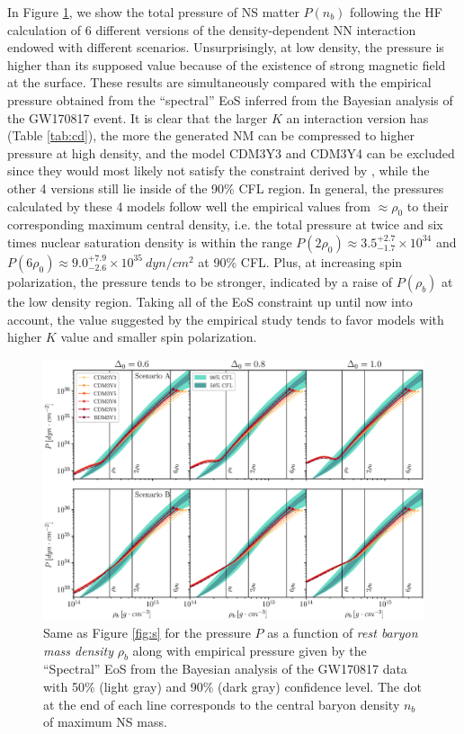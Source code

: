 In Figure \ref{fig:p}, we show the total pressure of \gls{NS} matter $P(n_b)$ following the \gls{HF} calculation of 6 different versions of the density-dependent \gls{NN} interaction endowed with different scenarios. Unsurprisingly, at low density, the pressure is higher than its supposed value because of the existence of strong magnetic field at the surface. These results are simultaneously compared with the empirical pressure obtained from the ``spectral'' \gls{EoS} inferred from the Bayesian analysis of the GW170817 event. It is clear that the larger $K$ an interaction version has (Table \ref{tab:cd}), the more the generated \gls{NM} can be compressed to higher pressure at high density, and the model CDM3Y3 and CDM3Y4 can be excluded since they would most likely not satisfy the constraint derived by \cite{abbott2018gw170817}, while the other 4 versions still lie inside of the 90\% \gls{CFL} region. In general, the pressures calculated by these 4 models follow well the empirical values from $\approx \rho_0$ to their corresponding maximum central density, i.e. the total pressure at twice and six times nuclear saturation density is within the range $P(2\rho_0)\approx 3.5^{+2.7}_{-1.7}\times 10^{34}$ and $P(6\rho_0)\approx 9.0^{+7.9}_{-2.6}\times 10^{35}\:dyn/cm^2$ at 90\% \gls{CFL}.  Plus, at increasing spin polarization, the pressure tends to be stronger, indicated by a raise of $P(\rho_b)$ at the low density region. Taking all of the \gls{EoS} constraint up until now into account, the value suggested by the empirical study tends to favor models with higher $K$ value and smaller spin polarization.\par
\begin{figure}[ht!]
        \centering
        \includegraphics[width=\textwidth]{fig/P.eps}
        \caption{Same as Figure \ref{fig:s} for the pressure $P$ as a function of \emph{rest baryon mass density} $\rho_b$ along with empirical pressure given by the ``Spectral'' \gls{EoS} from the Bayesian analysis of the GW170817 data \citep{abbott2018gw170817} with 50\% (light gray) and 90\% (dark gray) confidence level. The dot at the end of each line corresponds to the central baryon density $n_b$ of maximum \gls{NS} mass.}
        \label{fig:p}
\end{figure} 
